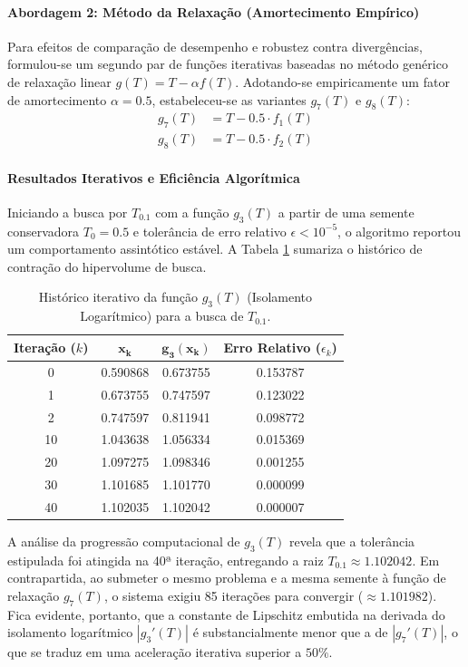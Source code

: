 \paragraph{Abordagem 2: Método da Relaxação (Amortecimento Empírico)}
Para efeitos de comparação de desempenho e robustez contra divergências, formulou-se um segundo par de funções iterativas baseadas no método genérico de relaxação linear $g(T) = T - \alpha f(T)$. Adotando-se empiricamente um fator de amortecimento $\alpha = 0.5$, estabeleceu-se as variantes $g_7(T)$ e $g_8(T)$:
\begin{align}
    g_7(T) &= T - 0.5 \cdot f_1(T) \label{eq:g7_ponto_fixo} \\
    g_8(T) &= T - 0.5 \cdot f_2(T) \label{eq:g8_ponto_fixo}
\end{align}

\paragraph{Resultados Iterativos e Eficiência Algorítmica}
Iniciando a busca por $T_{0.1}$ com a função $g_3(T)$ a partir de uma semente conservadora $T_0 = 0.5$ e tolerância de erro relativo $\epsilon < 10^{-5}$, o algoritmo reportou um comportamento assintótico estável. A Tabela \ref{tab:ponto_fixo_g3} sumariza o histórico de contração do hipervolume de busca.

\begin{table}[htpb]
\centering
\caption{Histórico iterativo da função $g_3(T)$ (Isolamento Logarítmico) para a busca de $T_{0.1}$.}
\label{tab:ponto_fixo_g3}
\small
\begin{tabular}{@{}cccc@{}}
\toprule
\textbf{Iteração ($k$)} & $\mathbf{x_k}$ & $\mathbf{g_3(x_k)}$ & \textbf{Erro Relativo} ($\epsilon_k$) \\ \midrule
0  & 0.590868 & 0.673755 & 0.153787 \\
1  & 0.673755 & 0.747597 & 0.123022 \\
2  & 0.747597 & 0.811941 & 0.098772 \\
10 & 1.043638 & 1.056334 & 0.015369 \\
20 & 1.097275 & 1.098346 & 0.001255 \\
30 & 1.101685 & 1.101770 & 0.000099 \\
40 & 1.102035 & 1.102042 & 0.000007 \\ \bottomrule
\end{tabular}
\end{table}

A análise da progressão computacional de $g_3(T)$ revela que a tolerância estipulada foi atingida na 40ª iteração, entregando a raiz $T_{0.1} \approx 1.102042$. Em contrapartida, ao submeter o mesmo problema e a mesma semente à função de relaxação $g_7(T)$, o sistema exigiu 85 iterações para convergir ($\approx 1.101982$). Fica evidente, portanto, que a constante de Lipschitz embutida na derivada do isolamento logarítmico $|g_3'(T)|$ é substancialmente menor que a de $|g_7'(T)|$, o que se traduz em uma aceleração iterativa superior a $50\%$.

